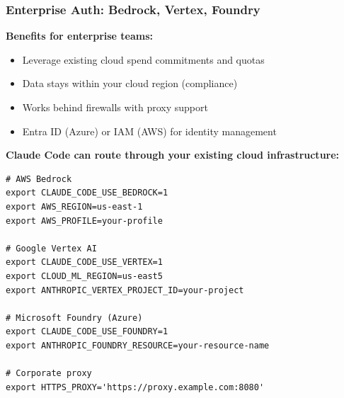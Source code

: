 \begin{frame}[fragile]\frametitle{Enterprise Auth: Bedrock, Vertex, Foundry}

\textbf{Benefits for enterprise teams:}
\begin{itemize}
    \item Leverage existing cloud spend commitments and quotas
    \item Data stays within your cloud region (compliance)
    \item Works behind firewalls with proxy support
    \item Entra ID (Azure) or IAM (AWS) for identity management
\end{itemize}

\textbf{Claude Code can route through your existing cloud infrastructure:}

\begin{lstlisting}
# AWS Bedrock
export CLAUDE_CODE_USE_BEDROCK=1
export AWS_REGION=us-east-1
export AWS_PROFILE=your-profile

# Google Vertex AI
export CLAUDE_CODE_USE_VERTEX=1
export CLOUD_ML_REGION=us-east5
export ANTHROPIC_VERTEX_PROJECT_ID=your-project

# Microsoft Foundry (Azure)
export CLAUDE_CODE_USE_FOUNDRY=1
export ANTHROPIC_FOUNDRY_RESOURCE=your-resource-name

# Corporate proxy
export HTTPS_PROXY='https://proxy.example.com:8080'
\end{lstlisting}

\end{frame}

